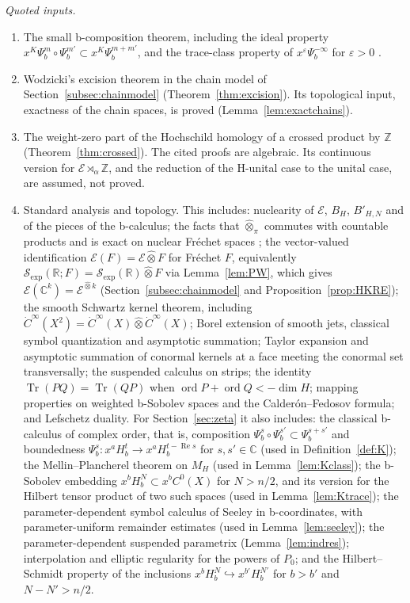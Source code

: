 \documentclass[11pt,oneside,reqno]{article}
\newcommand{\C}{\mathbb C}
\newcommand{\Z}{\mathbb Z}
\DeclareMathOperator{\Tr}{Tr}
\newcommand{\cE}{\mathcal E}
\newcommand{\Sexp}{\mathcal S_{\exp}}
\theoremstyle{plain}
\theoremstyle{definition}
\theoremstyle{remark}
\begin{document}
\emph{Quoted inputs.}
\begin{enumerate}
\item[(Q0)] The small b-composition theorem, including the ideal property
\(x^K\Psi_b^m\circ\Psi_b^{m'}\subset x^K\Psi_b^{m+m'}\), and the
trace-class property of \(x^\varepsilon\Psi_b^{-\infty}\) for
\(\varepsilon>0\) \cite{MelroseAPS,Notes}.
\item[(Q1)] Wodzicki's excision theorem in the chain model of
Section~\ref{subsec:chainmodel} (Theorem~\ref{thm:excision}). Its
topological input, exactness of the chain spaces, is proved
(Lemma~\ref{lem:exactchains}).
\item[(Q2)] The weight-zero part of the Hochschild homology of a crossed
product by \(\Z\) (Theorem~\ref{thm:crossed}). The cited proofs are
algebraic. Its continuous version for \(\cE\rtimes_\alpha\Z\), and the
reduction of the H-unital case to the unital case, are assumed, not
proved.
\item[(C3)] Standard analysis and topology. This includes: nuclearity of
\(\cE\), \(B_H\), \(B'_{H,N}\) and of the pieces of the b-calculus; the
facts that \(\widehat\otimes_\pi\) commutes with countable products and is
exact on nuclear Fréchet spaces \cite{Treves}; the vector-valued
identification \(\cE(F)=\cE\widehat\otimes F\) for Fréchet \(F\), equivalently
\(\Sexp(\mathbb R;F)=\Sexp(\mathbb R)\widehat\otimes F\) via
Lemma~\ref{lem:PW}, which gives \(\cE(\C^k)=\cE^{\widehat\otimes k}\)
(Section~\ref{subsec:chainmodel} and Proposition~\ref{prop:HKRE}); the smooth Schwartz kernel theorem, including
\(\dot C^\infty(X^2)=\dot C^\infty(X)\widehat\otimes\dot C^\infty(X)\);
Borel extension of smooth jets, classical symbol quantization and
asymptotic summation; Taylor
expansion and asymptotic summation of conormal kernels at a face meeting the
conormal set transversally; the suspended calculus on strips; the identity
\(\Tr(PQ)=\Tr(QP)\) when \(\operatorname{ord}P+\operatorname{ord}Q<-\dim H\);
mapping properties on weighted b-Sobolev spaces and the
Calder\'on--Fedosov formula; and Lefschetz duality. For
Section~\ref{sec:zeta} it also includes: the classical b-calculus of
complex order, that is, composition
\(\Psi_b^s\circ\Psi_b^{s'}\subset\Psi_b^{s+s'}\) and boundedness
\(\Psi_b^s:x^aH^t_b\to x^aH^{t-\operatorname{Re}s}_b\) for \(s,s'\in\C\)
(used in Definition~\ref{def:K}); the Mellin--Plancherel theorem on
\(M_H\) (used in Lemma~\ref{lem:Kclass}); the b-Sobolev embedding
\(x^bH^N_b\subset x^bC^0(X)\) for \(N>n/2\), and its version for the
Hilbert tensor product of two such spaces (used in
Lemma~\ref{lem:Ktrace}); the parameter-dependent symbol
calculus of Seeley \cite{SeeleyCP,Shubin} in b-coordinates, with
parameter-uniform remainder estimates (used in Lemma~\ref{lem:seeley}); the
parameter-dependent suspended parametrix (Lemma~\ref{lem:indres});
interpolation and elliptic regularity for the powers of \(P_0\); and the
Hilbert--Schmidt property of the inclusions
\(x^bH^N_b\hookrightarrow x^{b'}H^{N'}_b\) for \(b>b'\) and \(N-N'>n/2\).
\end{enumerate}
\end{document}
